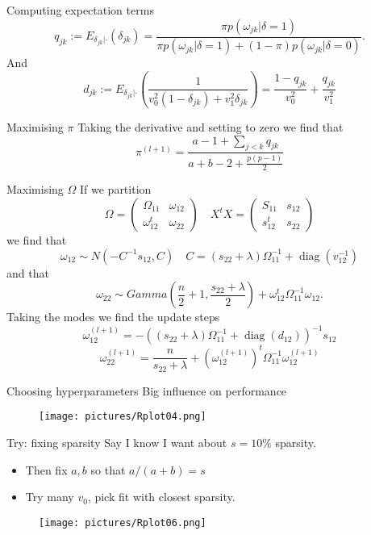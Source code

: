 \documentclass{beamer}
\DeclareMathOperator{\diag}{diag}
\begin{document}
\begin{frame}{Computing expectation terms}
	\[q_{jk} := E_{\delta_{jk} | \cdot}(\delta_{jk}) = \frac{\pi p(\omega_{jk} | \delta = 1)}{\pi p(\omega_{jk}
			| \delta = 1) + (1 - \pi) p(\omega_{jk} | \delta = 0)}.\]
	And
	\[ d_{jk} := E_{\delta_{jk} | \cdot}\left(\frac{1}{v_0^2 (1 - \delta_{jk}) + v_1^2
				\delta_{jk}}\right) = \frac{1 - q_{jk}}{v_0^2} + \frac{q_{jk}}{v_1^2} \]
\end{frame}
\begin{frame}{Maximising $\pi$}
	Taking the derivative and setting to zero we find that
	\[\pi^{(l+1)} = \frac{a - 1 + \sum_{j<k} q_{jk}}{a + b - 2 + \frac{p(p-1)}{2}}\]
\end{frame}
\begin{frame}{Maximising $\Omega$}
	If we partition
	\[\Omega = \begin{pmatrix}
			\Omega_{11}   & \omega_{12} \\
			\omega_{12}^t & \omega_{22}
		\end{pmatrix}
		\quad
		X^t X = \begin{pmatrix}
			S_{11}   & s_{12} \\
			s_{12}^t & s_{22}
		\end{pmatrix}
	\]
	we find that
	\[\omega_{12} \sim N(-C^{-1}s_{12}, C) \quad C=(s_{22} + \lambda) \Omega_{11}^{-1} + \diag(v_{12}^{-1})\]
	and that
	\[\omega_{22} \sim Gamma\left(\frac{n}{2} + 1, \frac{s_{22} +
			\lambda}{2}\right) + \omega_{12}^t\Omega_{11}^{-1}\omega_{12}.\]
	Taking the modes we find the update steps
	\[\omega_{12}^{(l+1)} = -((s_{22} + \lambda) \Omega_{11}^{-1} + \diag(d_{12}))^{-1} s_{12} \]
	\[\omega_{22}^{(l+1)} = \frac{n}{s_{22} + \lambda} + (\omega_{12}^{(l+1)})^t \Omega_{11}^{-1}\omega_{12}^{(l+1)}\]
\end{frame}
\begin{frame}{Choosing hyperparameters}
	Big influence on performance
	\begin{figure}
		\centering
		\texttt{[image: pictures/Rplot04.png]}
	\end{figure}
\end{frame}
\begin{frame}{Try: fixing sparsity}
	Say I know I want about $s = 10\%$ sparsity.
	\begin{itemize}
		\item Then fix $a, b$ so that $a / (a+b) = s$
		\item Try many $v_0$, pick fit with closest sparsity.
	\end{itemize}
	\begin{figure}
		\centering
		\texttt{[image: pictures/Rplot06.png]}
	\end{figure}
\end{frame}
\end{document}
